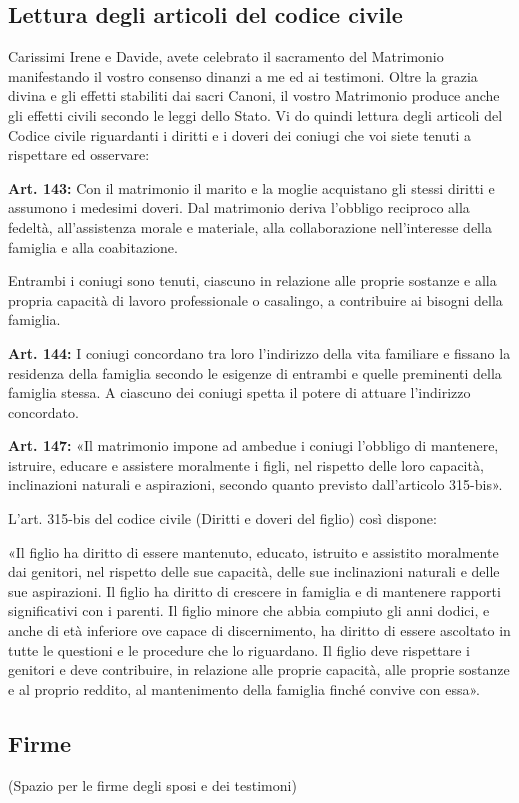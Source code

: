 
\subsection*{Lettura degli articoli del codice civile}

	\begin{dialoghi}
		\item[\sacerdote] Carissimi Irene e Davide, avete celebrato il sacramento del Matrimonio manifestando il vostro consenso dinanzi a me ed ai testimoni. Oltre la grazia divina e gli effetti stabiliti dai sacri Canoni, il vostro Matrimonio produce anche gli effetti civili secondo le leggi dello Stato. Vi do quindi lettura degli articoli del Codice civile riguardanti i diritti e i doveri dei coniugi che voi siete tenuti a rispettare ed osservare:

		\textbf{Art. 143:} Con il matrimonio il marito e la moglie acquistano gli stessi diritti e assumono i medesimi doveri. Dal matrimonio deriva l'obbligo reciproco alla fedeltà, all'assistenza morale e materiale, alla collaborazione nell'interesse della famiglia e alla coabitazione.

		Entrambi i coniugi sono tenuti, ciascuno in relazione alle proprie sostanze e alla propria capacità di lavoro professionale o casalingo, a contribuire ai bisogni della famiglia.

		\textbf{Art. 144:} I coniugi concordano tra loro l'indirizzo della vita familiare e fissano la residenza della famiglia secondo le esigenze di entrambi e quelle preminenti della famiglia stessa. A ciascuno dei coniugi spetta il potere di attuare l'indirizzo concordato.

		\textbf{Art. 147:} «Il matrimonio impone ad ambedue i coniugi l'obbligo di mantenere, istruire, educare e assistere moralmente i figli, nel rispetto delle loro capacità, inclinazioni naturali e aspirazioni, secondo quanto previsto dall'articolo 315-bis».

		L'art. 315-bis del codice civile (Diritti e doveri del figlio) così dispone:

		«Il figlio ha diritto di essere mantenuto, educato, istruito e assistito moralmente dai genitori, nel rispetto delle sue capacità, delle sue inclinazioni naturali e delle sue aspirazioni. Il figlio ha diritto di crescere in famiglia e di mantenere rapporti significativi con i parenti. Il figlio minore che abbia compiuto gli anni dodici, e anche di età inferiore ove capace di discernimento, ha diritto di essere ascoltato in tutte le questioni e le procedure che lo riguardano. Il figlio deve rispettare i genitori e deve contribuire, in relazione alle proprie capacità, alle proprie sostanze e al proprio reddito, al mantenimento della famiglia finché convive con essa».
	\end{dialoghi}

\subsection*{Firme}

	\begin{dialoghi}
		\item[\sacerdote] (Spazio per le firme degli sposi e dei testimoni)
	\end{dialoghi}